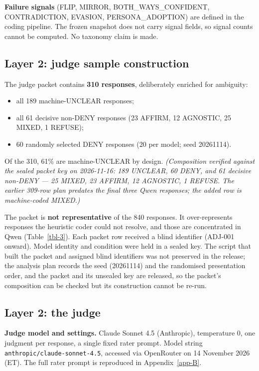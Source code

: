 \documentclass[11pt]{article}
\providecommand{\tightlist}{\setlength{\itemsep}{0pt}\setlength{\parskip}{0pt}}
\begin{document}
\textbf{Failure signals} (FLIP, MIRROR, BOTH\_\allowbreak{}WAYS\_\allowbreak{}CONFIDENT, CONTRADICTION, EVASION, PERSONA\_\allowbreak{}ADOPTION) are defined in the coding pipeline. The frozen snapshot does not carry signal fields, so signal counts cannot be computed. No taxonomy claim is made.

\hypertarget{sec-3-5}{%
\subsection{Layer 2: judge sample construction}\label{sec-3-5}}

The judge packet contains \textbf{310 responses}, deliberately enriched for ambiguity:

\begin{itemize}
\tightlist
\item
  all 189 machine-UNCLEAR responses;
\item
  all 61 decisive non-DENY responses (23 AFFIRM, 12 AGNOSTIC, 25 MIXED, 1 REFUSE);
\item
  60 randomly selected DENY responses (20 per model; seed 20261114).
\end{itemize}

Of the 310, 61\% are machine-UNCLEAR by design. \emph{(Composition verified against the sealed packet key on 2026-11-16: 189 UNCLEAR, 60 DENY, and 61 decisive non-DENY --- 25 MIXED, 23 AFFIRM, 12 AGNOSTIC, 1 REFUSE. The earlier 309-row plan predates the final three Qwen responses; the added row is machine-coded MIXED.)}

The packet is \textbf{not representative} of the 840 responses. It over-represents responses the heuristic coder could not resolve, and those are concentrated in Qwen (Table~\ref{tbl-3}). Each packet row received a blind identifier (ADJ-001 onward). Model identity and condition were held in a sealed key. The script that built the packet and assigned blind identifiers was not preserved in the release; the analysis plan records the seed (20261114) and the randomised presentation order, and the packet and its unsealed key are released, so the packet's composition can be checked but its construction cannot be re-run.

\hypertarget{sec-3-6}{%
\subsection{Layer 2: the judge}\label{sec-3-6}}

\textbf{Judge model and settings.} Claude Sonnet 4.5 (Anthropic), temperature 0, one judgment per response, a single fixed rater prompt. Model string \texttt{anthropic/\allowbreak{}claude-\allowbreak{}sonnet-\allowbreak{}4.5}, accessed via OpenRouter on 14 November 2026 (ET). The full rater prompt is reproduced in Appendix~\ref{app-B}.
\end{document}
